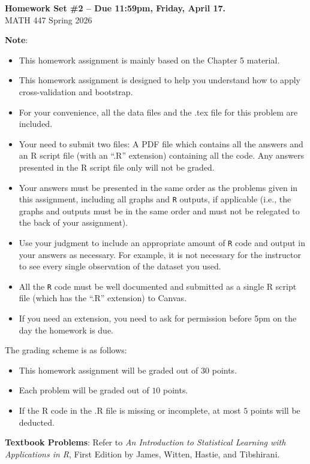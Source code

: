 \documentclass[12pt]{article}
\begin{document}
\newcommand{\bm}[1]{\mbox{\boldmath$#1$}}

\begin{center}{\bf Homework Set \#2 -- Due 11:59pm, Friday, April 17.} \\ {\sc MATH 447 Spring 2026}\end{center}
\textbf{Note}: 
\begin{itemize}
\item This homework assignment is mainly based on the Chapter 5 material. 
\item This homework assignment is designed to help you understand how to apply cross-validation and bootstrap.
\item For your convenience, all the data files and the .tex file for this problem are included.
\item Your need to submit two files: A PDF file which contains all the answers and an R script file (with an ``.R'' extension) containing all the code. Any answers presented in the R script file only will not be graded.
\item Your answers must be presented in the same order as the problems given in this assignment, including all graphs and {\tt R} outputs, if applicable (i.e., the graphs and outputs must be in the same order and must not be relegated to the back of your assignment). 
\item Use your judgment to include an appropriate amount of {\tt R} code and output in your answers as necessary. For example, it is not necessary for the instructor to see every single observation of the dataset you used.
\item All the {\tt R} code must be well documented and submitted as a single R script file (which has the ``.R'' extension) to Canvas. 
\item If you need an extension, you need to ask for permission before 5pm on the day the homework is due.
\end{itemize}

The grading scheme is as follows:
\begin{itemize}
\item This homework assignment will be graded out of $30$ points.
\item Each problem will be graded out of $10$ points.
\item If the R code in the .R file is missing or incomplete, at most $5$ points will be deducted.
\end{itemize}

\textbf{Textbook Problems}: Refer to \textit{An Introduction to Statistical Learning with Applications in R}, First Edition by James, Witten, Hastie, and Tibshirani.
\end{document}
